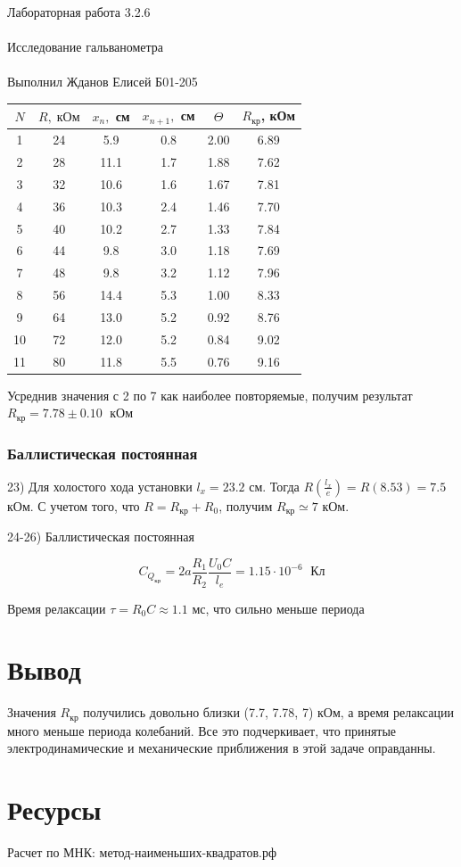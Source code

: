 \documentclass{astroedu-lab}
\begin{document}
\begin{problem}{\huge Лабораторная работа 3.2.6\\\\Исследование гальванометра\\\\Выполнил Жданов Елисей Б01-205}
\begin{table}[h]
	\centering
	\begin{tabular}{|c|c|c|c|c|c|}
		\hline
		$ N $& $ R, \; кОм $& $ x_n, $ см &$ x_{n+1}, $ см & $ \Theta $ & $ R_{\text{кр}} $, кОм\\
		\hline
		1 & 24 & 5.9 & 0.8 & 2.00 & 6.89 \\
		2 & 28 & 11.1 & 1.7 & 1.88 & 7.62 \\
		3 & 32 & 10.6 & 1.6 & 1.67 & 7.81 \\
		4 & 36 & 10.3 & 2.4 & 1.46 & 7.70 \\
		5 & 40 & 10.2 & 2.7 & 1.33 & 7.84 \\
		6 & 44 & 9.8 & 3.0 & 1.18 & 7.69 \\
		7 & 48 & 9.8 & 3.2 & 1.12 & 7.96 \\
		8 & 56 & 14.4 & 5.3 & 1.00 & 8.33 \\
		9 & 64 & 13.0 & 5.2 & 0.92 & 8.76 \\
		10 & 72 & 12.0 & 5.2 & 0.84 & 9.02 \\
		11 & 80 & 11.8 & 5.5 & 0.76 & 9.16 \\
		\hline
	\end{tabular}%
	\label{resR}%
\end{table}%

Усреднив значения с 2 по 7 как наиболее повторяемые, получим результат  $ R_{\text{кр}} = 7.78 \pm 0.10 \; \text{ кОм} $

\subsubsection{Баллистическая постоянная}

23) Для холостого хода установки $l_x = 23.2$ см. Тогда $R\left( \frac{l_x}{e} \right) = R (8.53) = 7.5$ кОм. С учетом того, что $R = R_\text{кр} + R_0$, получим $R_\text{кр} \simeq 7$ кОм.

24-26) Баллистическая постоянная

\begin{equation}
	C_{Q_{\text{кр}}} = 2a \dfrac{R_1}{R_2} \dfrac{U_0C}{l_e} = 1.15 \cdot 10^{-6} \; \text{ Кл}
\end{equation}

Время релаксации $\tau = R_0 C \approx 1.1$ мс, что сильно меньше периода

\section{Вывод}

Значения $R_\text{кр}$ получились довольно близки (7.7, 7.78, 7) кОм, а время релаксации много меньше периода колебаний. Все это подчеркивает, что принятые электродинамические и механические приближения в этой задаче оправданны.

\section{Ресурсы}

Расчет по МНК: метод-наименьших-квадратов.рф


\end{problem}
\end{document}
